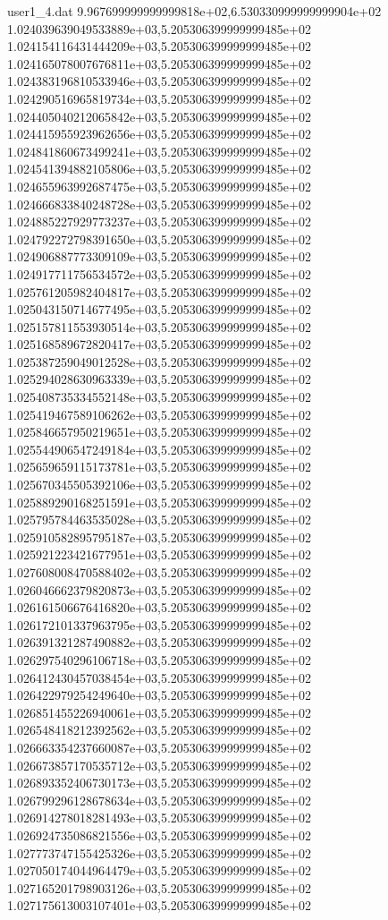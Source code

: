 \begin{filecontents}{user1_4.dat}
9.967699999999999818e+02,6.530330999999999904e+02
1.024039639049533889e+03,5.205306399999999485e+02
1.024154116431444209e+03,5.205306399999999485e+02
1.024165078007676811e+03,5.205306399999999485e+02
1.024383196810533946e+03,5.205306399999999485e+02
1.024290516965819734e+03,5.205306399999999485e+02
1.024405040212065842e+03,5.205306399999999485e+02
1.024415955923962656e+03,5.205306399999999485e+02
1.024841860673499241e+03,5.205306399999999485e+02
1.024541394882105806e+03,5.205306399999999485e+02
1.024655963992687475e+03,5.205306399999999485e+02
1.024666833840248728e+03,5.205306399999999485e+02
1.024885227929773237e+03,5.205306399999999485e+02
1.024792272798391650e+03,5.205306399999999485e+02
1.024906887773309109e+03,5.205306399999999485e+02
1.024917711756534572e+03,5.205306399999999485e+02
1.025761205982404817e+03,5.205306399999999485e+02
1.025043150714677495e+03,5.205306399999999485e+02
1.025157811553930514e+03,5.205306399999999485e+02
1.025168589672820417e+03,5.205306399999999485e+02
1.025387259049012528e+03,5.205306399999999485e+02
1.025294028630963339e+03,5.205306399999999485e+02
1.025408735334552148e+03,5.205306399999999485e+02
1.025419467589106262e+03,5.205306399999999485e+02
1.025846657950219651e+03,5.205306399999999485e+02
1.025544906547249184e+03,5.205306399999999485e+02
1.025659659115173781e+03,5.205306399999999485e+02
1.025670345505392106e+03,5.205306399999999485e+02
1.025889290168251591e+03,5.205306399999999485e+02
1.025795784463535028e+03,5.205306399999999485e+02
1.025910582895795187e+03,5.205306399999999485e+02
1.025921223421677951e+03,5.205306399999999485e+02
1.027608008470588402e+03,5.205306399999999485e+02
1.026046662379820873e+03,5.205306399999999485e+02
1.026161506676416820e+03,5.205306399999999485e+02
1.026172101337963795e+03,5.205306399999999485e+02
1.026391321287490882e+03,5.205306399999999485e+02
1.026297540296106718e+03,5.205306399999999485e+02
1.026412430457038454e+03,5.205306399999999485e+02
1.026422979254249640e+03,5.205306399999999485e+02
1.026851455226940061e+03,5.205306399999999485e+02
1.026548418212392562e+03,5.205306399999999485e+02
1.026663354237660087e+03,5.205306399999999485e+02
1.026673857170535712e+03,5.205306399999999485e+02
1.026893352406730173e+03,5.205306399999999485e+02
1.026799296128678634e+03,5.205306399999999485e+02
1.026914278018281493e+03,5.205306399999999485e+02
1.026924735086821556e+03,5.205306399999999485e+02
1.027773747155425326e+03,5.205306399999999485e+02
1.027050174044964479e+03,5.205306399999999485e+02
1.027165201798903126e+03,5.205306399999999485e+02
1.027175613003107401e+03,5.205306399999999485e+02

\end{filecontents}
